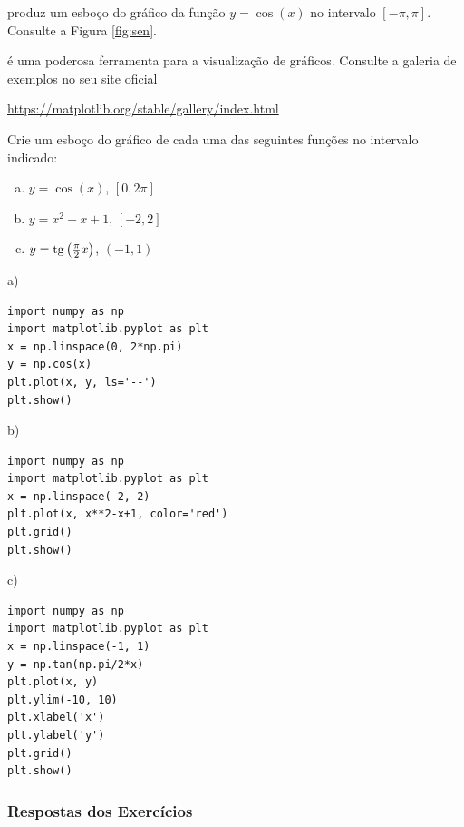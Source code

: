 produz um esboço do gráfico da função $y=\cos(x)$ no intervalo $[-\pi,\pi]$. Consulte a Figura \ref{fig:sen}.


\begin{obs}
  {\PYTHONmatplotlib} é uma poderosa ferramenta para a visualização de gráficos. Consulte a galeria de exemplos no seu site oficial
  \begin{center}
    \url{https://matplotlib.org/stable/gallery/index.html}
  \end{center}
\end{obs}

\begin{exer}
  Crie um esboço do gráfico de cada uma das seguintes funções no intervalo indicado:
  \begin{enumerate}[a)]
  \item $y = \cos(x)$, $\left[0, 2\pi\right]$
  \item $y = x^2 - x + 1$, $[-2, 2]$
  \item $y = \operatorname{tg}\left(\frac{\pi}{2}x\right)$, $(-1, 1)$
  \end{enumerate}
\end{exer}
\begin{resp}

a)

\begin{lstlisting}
import numpy as np
import matplotlib.pyplot as plt
x = np.linspace(0, 2*np.pi)
y = np.cos(x)
plt.plot(x, y, ls='--')
plt.show()
\end{lstlisting}

b)

\begin{lstlisting}
import numpy as np
import matplotlib.pyplot as plt
x = np.linspace(-2, 2)
plt.plot(x, x**2-x+1, color='red')
plt.grid()
plt.show()
\end{lstlisting}

c)

\begin{lstlisting}
import numpy as np
import matplotlib.pyplot as plt
x = np.linspace(-1, 1)
y = np.tan(np.pi/2*x)
plt.plot(x, y)
plt.ylim(-10, 10)
plt.xlabel('x')
plt.ylabel('y')
plt.grid()
plt.show()
\end{lstlisting}

\end{resp}

\ifisbook 
\subsubsection*{Respostas dos Exercícios}
\shipoutAnswer
\fi

